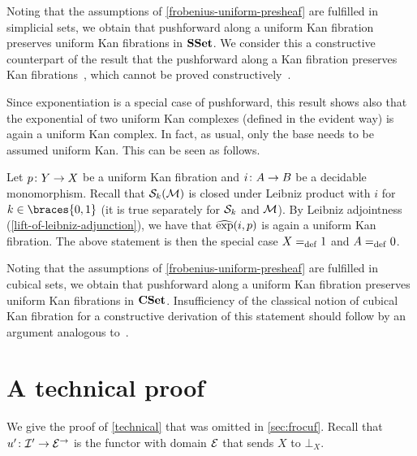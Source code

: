 \documentclass[reqno,10pt,a4paper,oneside,draft]{amsart}
\begin{document}
\begin{example}
Noting that the assumptions of \cref{frobenius-uniform-presheaf} are fulfilled in simplicial sets, we obtain that pushforward along a uniform Kan fibration preserves uniform Kan fibrations in $\SSet$.
We consider this a constructive counterpart of the result that the pushforward along a Kan fibration preserves Kan fibrations~\cite{voevodsky-simplicial-model}, which cannot be proved constructively~\cite{coquand-non-constructivity-kan}.

Since exponentiation is a special case of pushforward, this result shows also that the exponential of two uniform Kan complexes (defined in the evident way) is again a uniform Kan complex.
In fact, as usual, only the base needs to be assumed uniform Kan.
This can be seen as follows.

Let $p \co Y \to X$ be a uniform Kan fibration and $i \co A \to B$ be a decidable monomorphism.
Recall that $\cal{S}_k(\cal{M})$ is closed under Leibniz product with $i$ for $k \in \braces{0, 1}$ (it is true separately for $\cal{S}_k$ and $\cal{M}$).
By Leibniz adjointness (\cref{lift-of-leibniz-adjunction}), we have that $\hatexp(i, p)$ is again a uniform Kan fibration.
The above statement is then the special case $X \defeq 1$ and $A \defeq 0$.
\end{example}

\begin{example}
Noting that the assumptions of \cref{frobenius-uniform-presheaf} are fulfilled in cubical sets, we obtain that pushforward along a uniform Kan fibration preserves uniform Kan fibrations in $\CSet$.
Insufficiency of the classical notion of cubical Kan fibration for a constructive derivation of this statement should follow by an argument analogous to~\cite{coquand-non-constructivity-kan}.
\end{example}


\appendix

\section{A technical proof}
\label{app:tecp}

We give the proof of \cref{technical} that was omitted in \cref{sec:frocuf}.
Recall that $u' \co \cal{I}' \to \cal{E}^\to$ is the functor with domain $\cal{E}$ that sends $X$ to $\bot_X$.
\end{document}
